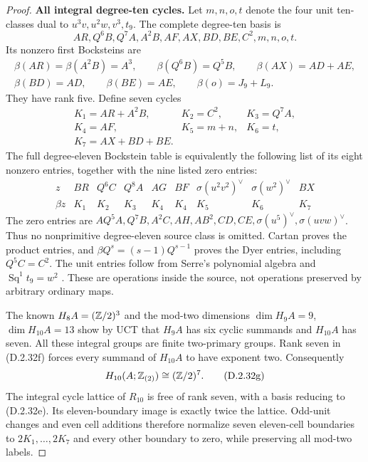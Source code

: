 \begin{proof}
\medskip\noindent
\textbf{All integral degree-ten cycles.}
Let $m,n,o,t$ denote the four unit ten-classes dual to
$u^3v,u^2w,v^3,t_9$. The complete degree-ten basis is
\[
 AR,Q^6B,Q^7A,A^2B,AF,AX,BD,BE,C^2,m,n,o,t.
\]
Its nonzero first Bocksteins are
\[
\begin{gathered}
 \beta(AR)=\beta(A^2B)=A^3,\qquad
 \beta(Q^6B)=Q^5B,\qquad \beta(AX)=AD+AE,\\
 \beta(BD)=AD,\qquad\beta(BE)=AE,\qquad
 \beta(o)=J_9+L_9.
\end{gathered}
 \tag{D.2.32d}
\]
They have rank five. Define seven cycles
\[
 \begin{array}{lll}
 K_1=AR+A^2B,&K_2=C^2,&K_3=Q^7A,\\
 K_4=AF,&K_5=m+n,&K_6=t,\\
 K_7=AX+BD+BE.&&
 \end{array}
 \tag{D.2.32e}
\]
The full degree-eleven Bockstein table is equivalently the
following list of its eight nonzero entries, together with
the nine listed zero entries:
\[
\begin{array}{c|cccccccc}
 z&BR&Q^6C&Q^8A&AG&BF&\sigma(u^2v^2)^\vee
                         &\sigma(w^2)^\vee&BX\\ \hline
 \beta z&K_1&K_2&K_3&K_4&K_4&K_5&K_6&K_7
\end{array}
 \tag{D.2.32f}
\]
The zero entries are
$AQ^5A,Q^7B,A^2C,AH,AB^2,CD,CE,
\sigma(u^5)^\vee,\sigma(uvw)^\vee$.
Thus no nonprimitive degree-eleven source class is omitted.
Cartan proves the product entries, and
$\beta Q^s=(s-1)Q^{s-1}$ proves the Dyer entries, including
$Q^5C=C^2$. The unit entries follow from Serre's polynomial
algebra and $\operatorname{Sq}^1t_9=w^2$
\cite[\S2, nos.~8--9]{I_Serre1953}
\cite[Chapter~I, Theorem~1.1]{I_CohenLadaMay1976}.
These are operations inside the source, not operations
preserved by arbitrary ordinary maps.

The known $H_8A=(\mathbb Z/2)^3$ and the mod-two dimensions
$\dim H_9A=9$, $\dim H_{10}A=13$ show by UCT that
$H_9A$ has six cyclic summands and $H_{10}A$ has seven.
All these integral groups are finite two-primary groups.
Rank seven in (D.2.32f) forces every summand of $H_{10}A$
to have exponent two. Consequently
\[
 H_{10}(A;\mathbb Z_{(2)})\cong(\mathbb Z/2)^7.
 \tag{D.2.32g}
\]
The integral cycle lattice of $R_{10}$ is free of rank
seven, with a basis reducing to (D.2.32e). Its eleven-boundary
image is exactly twice the lattice. Odd-unit changes and
even cell additions therefore normalize seven eleven-cell
boundaries to $2K_1,\ldots,2K_7$ and every other boundary
to zero, while preserving all mod-two labels.


\end{proof}
